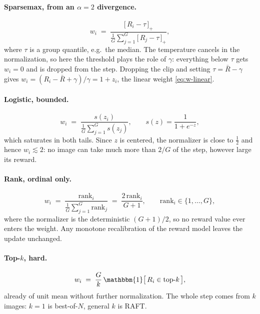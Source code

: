 \documentclass[10pt]{article} %
\begin{document}
\paragraph{Sparsemax, from an $\alpha{=}2$ divergence.}
\begin{equation}\label{eq:w-sparsemax}
w_i\;=\;\frac{\big[\,R_i-\tau\,\big]_+}{\frac{1}{G}\sum_{j=1}^{G}\big[\,R_j-\tau\,\big]_+},
\end{equation}
where $\tau$ is a group quantile, e.g.\ the median. The temperature cancels in the normalization, so here
the threshold plays the role of $\gamma$: everything below $\tau$ gets $w_i=0$ and is dropped from the
step. Dropping the clip and setting $\tau=\bar{R}-\gamma$ gives $w_i=(R_i-\bar{R}+\gamma)/\gamma=1+z_i$,
the linear weight \eqref{eq:w-linear}.


\paragraph{Logistic, bounded.}
\begin{equation}\label{eq:w-logistic}
w_i\;=\;\frac{s(z_i)}{\frac{1}{G}\sum_{j=1}^{G}s(z_j)},\qquad s(z)=\frac{1}{1+e^{-z}},
\end{equation}
which saturates in both tails. Since $z$ is centered, the normalizer is close to $\tfrac12$ and hence
$w_i\lesssim2$: no image can take much more than $2/G$ of the step, however large its reward.

\paragraph{Rank, ordinal only.}
\begin{equation}\label{eq:w-rank}
w_i\;=\;\frac{\mathrm{rank}_i}{\frac{1}{G}\sum_{j=1}^{G}\mathrm{rank}_j}\;=\;\frac{2\,\mathrm{rank}_i}{G+1},
\qquad \mathrm{rank}_i\in\{1,\dots,G\},
\end{equation}
where the normalizer is the deterministic $(G{+}1)/2$, so no reward value ever enters the weight. Any
monotone recalibration of the reward model leaves the update unchanged.

\paragraph{Top-$k$, hard.}
\begin{equation}\label{eq:w-topk}
w_i\;=\;\frac{G}{k}\,\mathbbm{1}\big[\,R_i\in\mathrm{top}\text{-}k\,\big],
\end{equation}
already of unit mean without further normalization. The whole step comes from $k$ images: $k=1$ is
best-of-$N$, general $k$ is RAFT.
\end{document}
